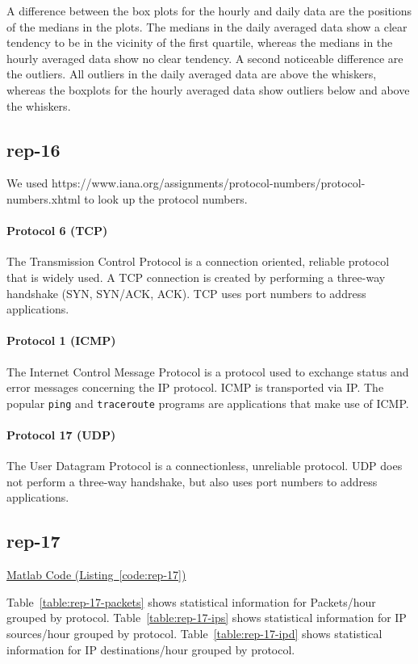 \documentclass{article}
\newcommand{\codelink}[1]{%
    \hyperref[#1]{\faArrowCircleRight\enskip Matlab Code (Listing~\ref{#1})}%
}
\begin{document}
A difference between the box plots for the hourly and daily data are the positions of
the medians in the plots. The medians in the daily averaged data show a clear tendency to
be in the vicinity of the first quartile, whereas the medians in the hourly averaged data
show no clear tendency.
A second noticeable difference are the outliers. All outliers in the daily averaged data are
above the whiskers, whereas the boxplots for the hourly averaged data show outliers below and
above the whiskers.

\subsection{rep-16}

We used https://www.iana.org/assignments/protocol-numbers/protocol-numbers.xhtml to look up the
protocol numbers.

\paragraph{Protocol 6 (TCP)}
The Transmission Control Protocol is a connection oriented, reliable protocol that is widely used.
A TCP connection is created by performing a three-way handshake (SYN, SYN/ACK, ACK). TCP uses
port numbers to address applications.

\paragraph{Protocol 1 (ICMP)}
The Internet Control Message Protocol is a protocol used to exchange status and error messages
concerning the IP protocol. ICMP is transported via IP. The popular \texttt{ping} and \texttt{traceroute}
programs are applications that make use of ICMP.

\paragraph{Protocol 17 (UDP)}
The User Datagram Protocol is a connectionless, unreliable protocol. UDP does not perform
a three-way handshake, but also uses port numbers to address applications.

\subsection{rep-17}
\codelink{code:rep-17}

Table~\ref{table:rep-17-packets} shows statistical information for Packets/hour grouped by protocol.
Table~\ref{table:rep-17-ips} shows statistical information for IP sources/hour grouped by protocol.
Table~\ref{table:rep-17-ipd} shows statistical information for IP destinations/hour grouped by protocol.
\end{document}
